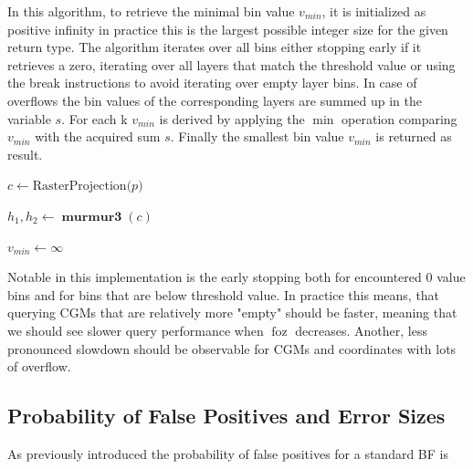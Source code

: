 \documentclass[sigconf]{acmart}
\DeclareMathOperator{\foz}{foz}
\DeclareMathOperator{\hash}{\textbf{murmur3}}
\begin{document}
In this algorithm, to retrieve the minimal bin value $v_{min}$, it is initialized as positive infinity in practice this is the largest possible integer size for the given return type. The algorithm iterates over all bins either stopping early if it retrieves a zero, iterating over all layers that match the threshold value or using the break instructions to avoid iterating over empty layer bins. In case of overflows the bin values of the corresponding layers are summed up in the variable $s$. For each k $v_{min}$ is derived by applying the $\min$ operation comparing $v_{min}$ with the acquired sum $s$. Finally the smallest bin value $v_{min}$ is returned as result.

\begin{algorithm}
  \SetAlgoLined


  $c \leftarrow \text{RasterProjection(}p\text{)}$

  $h_1, h_2 \leftarrow \hash(c)$

  $v_{min} \leftarrow \infty$

  \caption{GET Operation}
  \label{ls:get-operation}
\end{algorithm}

Notable in this implementation is the early stopping both for encountered $0$ value bins and for bins that are below threshold value.
In practice this means, that querying CGMs that are relatively more "empty" should be faster, meaning that we should see slower query performance when $\foz$ decreases. Another, less pronounced slowdown should be observable for CGMs and coordinates with lots of overflow.


\subsection{Probability of False Positives and Error Sizes}


As previously introduced the probability of false positives for a standard BF is
\end{document}
